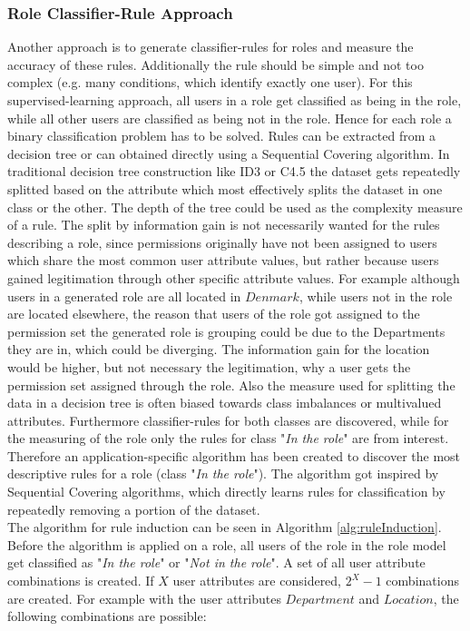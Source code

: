         \subsubsection{Role Classifier-Rule Approach}
        \label{sec:classifierRule}
        Another approach is to generate classifier-rules for roles and measure the accuracy of these rules. Additionally the rule should be simple and not too complex (e.g. many conditions, which identify exactly one user). For this supervised-learning approach, all users in a role get classified as being in the role, while all other users are classified as being not in the role. Hence for each role a binary classification problem has to be solved. Rules can be extracted from a decision tree or can obtained directly using a Sequential Covering algorithm\cite{Han}. In traditional decision tree construction like ID3 or C4.5 the dataset gets repeatedly splitted based on the attribute which most effectively splits the dataset in one class or the other. The depth of the tree could be used as the complexity measure of a rule. The split by information gain is not necessarily wanted for the rules describing a role, since permissions originally have not been assigned to users which share the most common user attribute values, but rather because users gained legitimation through other specific attribute values. For example although users in a generated role are all located in $Denmark$, while users not in the role are located elsewhere, the reason that users of the role got assigned to the permission set the generated role is grouping could be due to the Departments they are in, which could be diverging. The information gain for the location would be higher, but not necessary the legitimation, why a user gets the permission set assigned through the role. Also the measure used for splitting the data in a decision tree is often biased towards class imbalances or multivalued attributes\cite{Han}. Furthermore classifier-rules for both classes are discovered, while for the measuring of the role only the rules for class "\textit{In the role}" are from interest. Therefore an application-specific algorithm has been created to discover the most descriptive rules for a role (class "\textit{In the role}"). The algorithm got inspired by Sequential Covering algorithms, which directly learns rules for classification by repeatedly removing a portion of the dataset.\\
        The algorithm for rule induction can be seen in Algorithm \ref{alg:ruleInduction}. Before the algorithm is applied on a role, all users of the role in the role model get classified as "\textit{In the role}" or "\textit{Not in the role}". A set of all user attribute combinations is created. If $X$ user attributes are considered, $2^X-1$ combinations are created. For example with the user attributes $Department$ and $Location$, the following combinations are possible:\\
